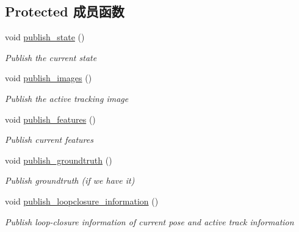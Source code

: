\subsection*{Protected 成员函数}
\begin{DoxyCompactItemize}
\item 
\mbox{\label{classov__msckf_1_1ROS2Visualizer_aea6f0c1073edfe9b47dcaf1ef341d4be}} 
void \hyperlink{classov__msckf_1_1ROS2Visualizer_aea6f0c1073edfe9b47dcaf1ef341d4be}{publish\+\_\+state} ()
\begin{DoxyCompactList}\small\item\em Publish the current state \end{DoxyCompactList}\item 
\mbox{\label{classov__msckf_1_1ROS2Visualizer_a1fac4c51134464475f3a40b15ab252af}} 
void \hyperlink{classov__msckf_1_1ROS2Visualizer_a1fac4c51134464475f3a40b15ab252af}{publish\+\_\+images} ()
\begin{DoxyCompactList}\small\item\em Publish the active tracking image \end{DoxyCompactList}\item 
\mbox{\label{classov__msckf_1_1ROS2Visualizer_ab88802145290ae7b52b3d544b70db3a9}} 
void \hyperlink{classov__msckf_1_1ROS2Visualizer_ab88802145290ae7b52b3d544b70db3a9}{publish\+\_\+features} ()
\begin{DoxyCompactList}\small\item\em Publish current features \end{DoxyCompactList}\item 
\mbox{\label{classov__msckf_1_1ROS2Visualizer_a160bf85485c49a5f80462ad717e12837}} 
void \hyperlink{classov__msckf_1_1ROS2Visualizer_a160bf85485c49a5f80462ad717e12837}{publish\+\_\+groundtruth} ()
\begin{DoxyCompactList}\small\item\em Publish groundtruth (if we have it) \end{DoxyCompactList}\item 
\mbox{\label{classov__msckf_1_1ROS2Visualizer_a81f6ad6d7e9e03f950ce58ad2c065844}} 
void \hyperlink{classov__msckf_1_1ROS2Visualizer_a81f6ad6d7e9e03f950ce58ad2c065844}{publish\+\_\+loopclosure\+\_\+information} ()
\begin{DoxyCompactList}\small\item\em Publish loop-\/closure information of current pose and active track information \end{DoxyCompactList}\end{DoxyCompactItemize}
